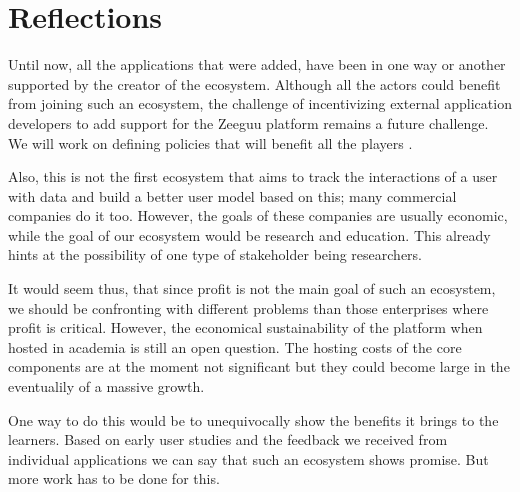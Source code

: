 
\section {Reflections}

Until now, all the applications that were added, have been in one way or another supported by the creator of the ecosystem. Although all the actors could benefit from joining such an ecosystem,  the challenge of incentivizing external application developers to add support for the Zeeguu platform remains a future challenge. We will work on defining policies that will benefit all the players \cite{Jans09agenda}. 


Also, this is not the first ecosystem that aims to track 
the interactions of a user with data and build a better 
user model based on this; many commercial companies do it too. 
However, the goals of these companies are usually economic, 
while the goal of our ecosystem would be research and education. This already hints at the possibility of one type of stakeholder being researchers.

It would seem thus, that since profit is not the main
goal of such an ecosystem, we should be confronting
with different problems than those enterprises where 
profit is critical. However, the economical 
sustainability of the platform when hosted in academia
is still an open question. The hosting costs of the 
core components are at the moment not significant 
but they could become large in the eventualily of 
a massive growth.


One way to do this would be to unequivocally show 
the benefits it brings to the learners. Based on 
early user studies and the feedback we received 
from individual applications we can say that such
an ecosystem shows promise. But more work has to 
be done for this. 







